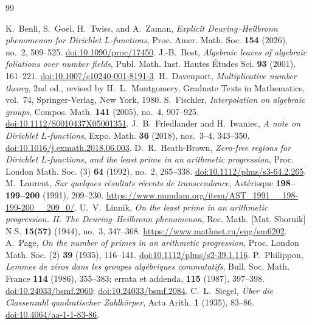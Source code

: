 \documentclass[11pt,a4paper]{amsart}
\theoremstyle{remark}
\numberwithin{equation}{section}
\begin{document}
\begin{thebibliography}{99}
\raggedright
{}
K.~Benli, S.~Goel, H.~Twiss, and A.~Zaman,
\emph{Explicit Deuring--Heilbronn phenomenon for Dirichlet $L$-functions},
Proc. Amer. Math. Soc. \textbf{154} (2026), no.~2, 509--525.
\href{https://doi.org/10.1090/proc/17450}{doi:10.1090/proc/17450}.
J.-B.~Bost, \emph{Algebraic leaves of algebraic foliations over number fields},
Publ. Math. Inst. Hautes \'Etudes Sci. \textbf{93} (2001), 161--221.
\href{https://doi.org/10.1007/s10240-001-8191-3}{doi:10.1007/s10240-001-8191-3}.
H.~Davenport, \emph{Multiplicative number theory}, 2nd ed., revised by
H.~L.~Montgomery, Graduate Texts in Mathematics, vol.~74,
Springer-Verlag, New York, 1980.
S.~Fischler, \emph{Interpolation on algebraic groups},
Compos. Math. \textbf{141} (2005), no.~4, 907--925.
\href{https://doi.org/10.1112/S0010437X05001351}{doi:10.1112/S0010437X05001351}.
J.~B.~Friedlander and H.~Iwaniec, \emph{A note on Dirichlet $L$-functions},
Expo. Math. \textbf{36} (2018), nos.~3--4, 343--350.
\href{https://doi.org/10.1016/j.exmath.2018.06.003}{doi:10.1016/j.exmath.2018.06.003}.
D.~R.~Heath-Brown, \emph{Zero-free regions for Dirichlet $L$-functions,
and the least prime in an arithmetic progression},
Proc. London Math. Soc. (3) \textbf{64} (1992), no.~2, 265--338.
\href{https://doi.org/10.1112/plms/s3-64.2.265}{doi:10.1112/plms/s3-64.2.265}.
M.~Laurent, \emph{Sur quelques r\'esultats r\'ecents de transcendance},
Ast\'erisque \textbf{198--199--200} (1991), 209--230.
\url{https://www.numdam.org/item/AST_1991__198-199-200__209_0/}.
U.~V.~Linnik, \emph{On the least prime in an arithmetic progression.
II. The Deuring--Heilbronn phenomenon},
Rec. Math. [Mat. Sbornik] N.S. \textbf{15(57)} (1944), no.~3, 347--368.
\url{https://www.mathnet.ru/eng/sm6202}.
A.~Page, \emph{On the number of primes in an arithmetic progression},
Proc. London Math. Soc. (2) \textbf{39} (1935), 116--141.
\href{https://doi.org/10.1112/plms/s2-39.1.116}{doi:10.1112/plms/s2-39.1.116}.
P.~Philippon, \emph{Lemmes de z\'eros dans les groupes alg\'ebriques commutatifs},
Bull. Soc. Math. France \textbf{114} (1986), 355--383;
errata et addenda, \textbf{115} (1987), 397--398.
\href{https://doi.org/10.24033/bsmf.2060}{doi:10.24033/bsmf.2060};
\href{https://doi.org/10.24033/bsmf.2084}{doi:10.24033/bsmf.2084}.
C.~L.~Siegel, \emph{\"Uber die Classenzahl quadratischer Zahlk\"orper},
Acta Arith. \textbf{1} (1935), 83--86.
\href{https://doi.org/10.4064/aa-1-1-83-86}{doi:10.4064/aa-1-1-83-86}.
\end{thebibliography}
\end{document}
